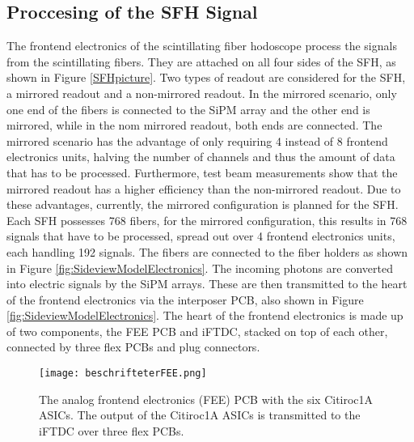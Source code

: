 \subsection{Proccesing of the SFH Signal}
The frontend electronics of the scintillating fiber hodoscope process the signals from the scintillating fibers.
They are attached on all four sides of the SFH, as shown in Figure \ref{SFHpicture}.
\newline 
Two types of readout are considered for the SFH, a mirrored readout and a non-mirrored readout.
In the mirrored scenario, only one end of the fibers is connected to the SiPM array and the other end is mirrored,
while in the nom mirrored readout, both ends are connected.\autocite{InternalcommunicationKarl}
\newline
The mirrored scenario has the advantage of only requiring 4 instead of 8 frontend electronics units, halving the number of channels and thus the amount of data that has to be processed.
Furthermore, test beam measurements show that the mirrored readout has a higher efficiency than the non-mirrored readout.\autocite{InternalcommunicationIgor}
\newline
Due to these advantages, currently, the mirrored configuration is planned for the SFH.\autocite{InternalcommunicationKarl}
\newline
Each SFH possesses 768 fibers, for the mirrored configuration, this results in 768 signals that have to be processed, spread out over 4 frontend electronics units, each handling 192 signals. 
\newline
The fibers are connected to the fiber holders as shown in Figure \ref{fig:SideviewModelElectronics}.
The incoming photons are converted into electric signals by the SiPM arrays.
\newline
These are then transmitted to the heart of the frontend electronics via the interposer PCB, also shown in Figure \ref{fig:SideviewModelElectronics}.
\newline
The heart of the frontend electronics is made up of two components, the FEE PCB and iFTDC, stacked on top of each other,
connected by three flex PCBs and plug connectors.
\newline
\begin{figure}[H]
    \centering
    \texttt{[image: beschrifteterFEE.png]}
    \caption{The analog frontend electronics (FEE) PCB with the six Citiroc1A ASICs.
    The output of the Citiroc1A ASICs is transmitted to the iFTDC over three flex PCBs.\autocite{InternalcommunicationKarl}}
    \label{fig:FEE}
\end{figure}
